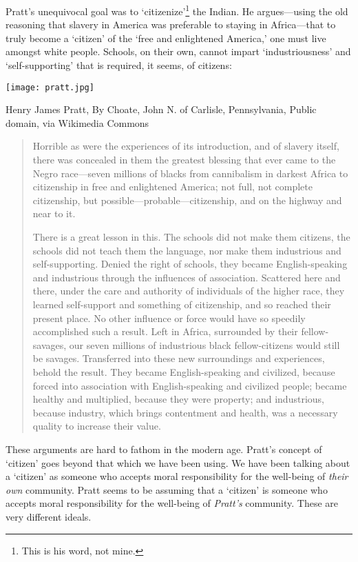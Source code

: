Pratt's unequivocal goal was to `citizenize'\footnote{This is his word, not mine.} the Indian. He argues---using the old reasoning that slavery in America was preferable to staying in Africa---that to truly become a `citizen' of the `free and enlightened America,' one must live amongst white people. Schools, on their own, cannot impart `industriousness' and `self-supporting' that is required, it seems, of citizens:\begin{marginfigure}\texttt{[image: pratt.jpg]}\caption{Henry James Pratt, By Choate, John N. of Carlisle, Pennsylvania, Public domain, via Wikimedia Commons}\label{fig:pratt}\end{marginfigure}

\begin{quote}

Horrible as were the experiences of its introduction, and of slavery itself, there was concealed in them the greatest blessing that ever came to the Negro race---seven millions of blacks from cannibalism in darkest Africa to citizenship in free and enlightened America; not full, not complete citizenship, but possible---probable---citizenship, and on the highway and near to it.

There is a great lesson in this. The schools did not make them citizens, the schools did not teach them the language, nor make them industrious and self-supporting. Denied the right of schools, they became English-speaking and industrious through the influences of association. Scattered here and there, under the care and authority of individuals of the higher race, they learned self-support and something of citizenship, and so reached their present place. No other influence or force would have so speedily accomplished such a result. Left in Africa, surrounded by their fellow-savages, our seven millions of industrious black fellow-citizens would still be savages. Transferred into these new surroundings and experiences, behold the result. They became English-speaking and civilized, because forced into association with English-speaking and civilized people; became healthy and multiplied, because they were property; and industrious, because industry, which brings contentment and health, was a necessary quality to increase their value.
\end{quote}

These arguments are hard to fathom in the modern age. Pratt's concept of `citizen' goes beyond that which we have been using. We have been talking about a `citizen' as someone who accepts moral responsibility for the well-being of \emph{their own} community. Pratt seems to be assuming that a `citizen' is someone who accepts moral responsibility for the well-being of \emph{Pratt's} community. These are very different ideals.

